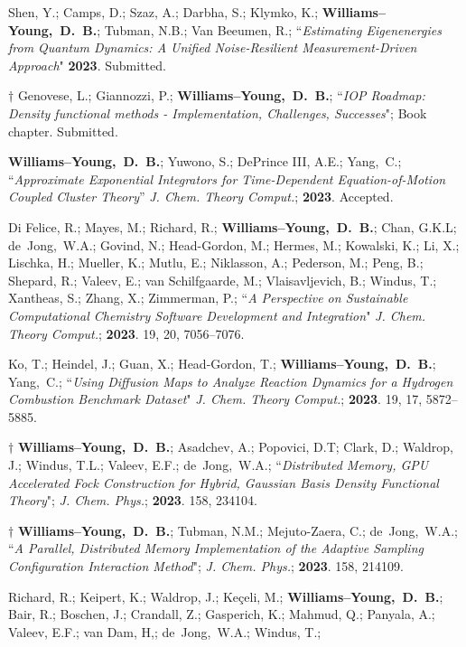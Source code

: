 \documentclass[10pt]{res} %
\newcommand*\me[0]{{\bf Williams--Young,~D.~B.}}
\newcommand*\cy[0]{Yang,~C.}
\newcommand*\bdj[0]{de~Jong,~W.A.}
\begin{document}
\begin{resume}
\begin{etaremune}
  \item Shen, Y.; Camps, D.; Szaz, A.; Darbha, S.; Klymko, K.; \me; Tubman, N.B.; Van Beeumen, R.;
        ``\emph{Estimating Eigenenergies from Quantum Dynamics: A Unified Noise-Resilient Measurement-Driven Approach}"
        \textbf{2023}. Submitted.
  \item $\dagger$ Genovese, L.; Giannozzi, P.; \me;
        ``\emph{IOP Roadmap: Density functional methods - Implementation, 
                Challenges, Successes}";
        Book chapter. Submitted.
  \item \me; Yuwono, S.; DePrince III, A.E.; \cy; 
        ``\emph{Approximate Exponential Integrators for Time-Dependent Equation-of-Motion Coupled Cluster Theory}”
	\emph{J. Chem. Theory Comput.}; \textbf{2023}. Accepted.
  \item Di Felice, R.; Mayes, M.; Richard, R.; \me; Chan, G.K.L; \bdj; 
        Govind, N.; Head-Gordon, M.; Hermes, M.; Kowalski, K.; Li, X.; Lischka, H.; Mueller, K.; 
	Mutlu, E.; Niklasson, A.; Pederson, M.; Peng, B.; Shepard, R.; Valeev, E.; van Schilfgaarde, M.; 
	Vlaisavljevich, B.; Windus, T.; Xantheas, S.; Zhang, X.; Zimmerman, P.;
	``\emph{A Perspective on Sustainable Computational Chemistry Software Development and Integration}"
	\emph{J. Chem. Theory Comput.}; \textbf{2023}. 19, 20, 7056–7076.
  \item Ko, T.; Heindel, J.; Guan, X.;  Head-Gordon, T.; \me; \cy; 
        ``\emph{Using Diffusion Maps to Analyze Reaction Dynamics for a Hydrogen Combustion Benchmark Dataset}"
        \emph{J. Chem. Theory Comput.}; \textbf{2023}. 19, 17, 5872–5885.
  \item $\dagger$ \me; Asadchev, A.; Popovici, D.T; Clark, D.; Waldrop, J.; Windus, T.L.;
        Valeev, E.F.; \bdj;
        ``\emph{Distributed Memory, GPU Accelerated Fock Construction for Hybrid, Gaussian 
                Basis Density Functional Theory}";
        \emph{J. Chem. Phys.}; \textbf{2023}. 158, 234104.
  \item $\dagger$ \me; Tubman, N.M.; Mejuto-Zaera, C.; \bdj;
        ``\emph{A Parallel, Distributed Memory Implementation of the Adaptive 
                Sampling Configuration Interaction Method}";
        \emph{J. Chem. Phys.}; \textbf{2023}. 158, 214109. 
  \item Richard, R.; Keipert, K.; Waldrop, J.; Keçeli, M.; \me; Bair, R.; Boschen, J.; 
        Crandall, Z.; Gasperich, K.; Mahmud, Q.; Panyala, A.; Valeev, E.F.; van Dam, H,; 
        \bdj; Windus, T.;

\end{etaremune}
\end{resume}
\end{document}
